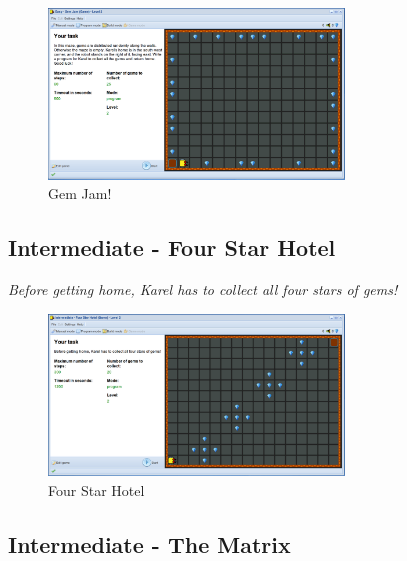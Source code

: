 \documentclass[article,A4,12pt]{llncs}
\begin{document}
\begin{figure}[!ht]
\begin{center}
\includegraphics[width=0.7\textwidth]{img/game-gemjam.png}
\end{center}
\vspace{-4mm}
\caption{Gem Jam!}
\label{fig:gemjam}
\vspace{-10mm}
\end{figure}
\noindent

\subsection{Intermediate - Four Star Hotel}

{\em Before getting home, Karel has to collect all four stars of gems! }

\begin{figure}[!ht]
\begin{center}
\includegraphics[width=0.7\textwidth]{img/game-fourstar.png}
\end{center}
\vspace{-4mm}
\caption{Four Star Hotel}
\label{fig:fourstar}
\vspace{-10mm}
\end{figure}
\noindent

\newpage

\subsection{Intermediate - The Matrix}
\end{document}

